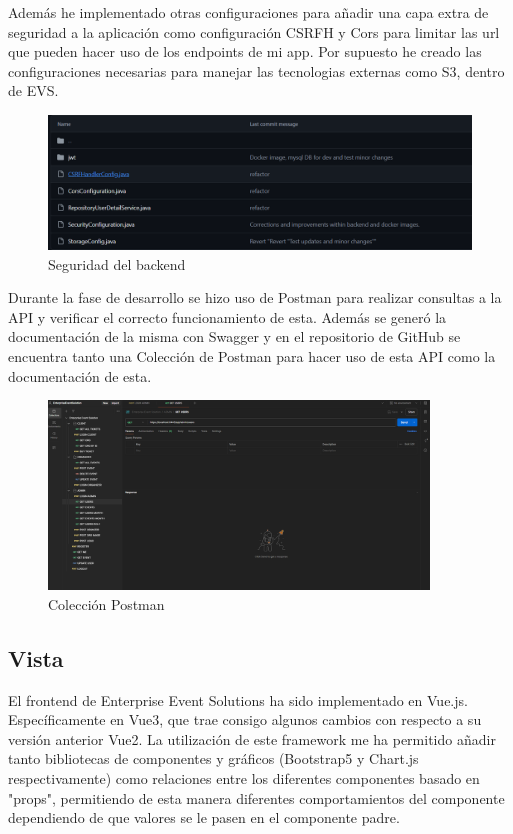 Además he implementado otras configuraciones para añadir una capa extra de seguridad a la aplicación como configuración CSRFH y Cors  para limitar las url 
que pueden hacer uso de los endpoints de mi app. Por supuesto he creado las configuraciones necesarias para manejar las tecnologias externas como S3, dentro de 
EVS.
\newpage
\begin{figure}[h]
    \centering
    \includegraphics[width=1\textwidth]{security.png} 
    \caption{Seguridad del backend}
    \label{fig:securityClasses}
\end{figure}

Durante la fase de desarrollo se hizo uso de Postman para realizar consultas a la API y verificar el correcto funcionamiento de esta. Además se generó la documentación de la
misma con Swagger y en el repositorio de GitHub se encuentra tanto una Colección de Postman para hacer uso de esta API como la documentación de esta.
\newpage
\begin{figure}[h]
    \centering
    \includegraphics[width=0.9\textwidth]{postman.png} 
    \caption{Colección Postman}
    \label{fig:postman}
\end{figure}

\subsection{Vista}
El frontend de Enterprise Event Solutions ha sido implementado en Vue.js. Específicamente en Vue3, que trae consigo algunos cambios con respecto a su versión
anterior Vue2. La utilización de este framework me ha permitido añadir tanto bibliotecas de componentes y gráficos (Bootstrap5 y Chart.js respectivamente)
como relaciones entre los diferentes componentes basado en "props", permitiendo de esta manera diferentes comportamientos del componente dependiendo de
que valores se le pasen en el componente padre.

